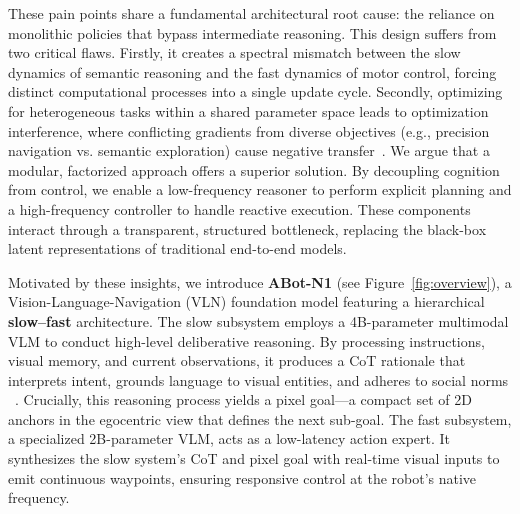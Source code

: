 

These pain points share a fundamental architectural root cause: the reliance on monolithic policies that bypass intermediate reasoning. 
This design suffers from two critical flaws. 
Firstly, it creates a spectral mismatch between the slow dynamics of semantic reasoning and the fast dynamics of motor control, forcing distinct computational processes into a single update cycle. 
Secondly, optimizing for heterogeneous tasks within a shared parameter space leads to optimization interference, where conflicting gradients from diverse objectives (e.g., precision navigation vs. semantic exploration) cause negative transfer~\cite{yu2020gradient,liu2021conflict}. 
We argue that a modular, factorized approach offers a superior solution. 
By decoupling cognition from control, we enable a low-frequency reasoner to perform explicit planning and a high-frequency controller to handle reactive execution. These components interact through a transparent, structured bottleneck, replacing the black-box latent representations of traditional end-to-end models.


Motivated by these insights, we introduce \textbf{ABot-N1} (see Figure~\ref{fig:overview}), a Vision-Language-Navigation (VLN) foundation model featuring a hierarchical \textbf{slow–fast} architecture. The slow subsystem employs a 4B-parameter multimodal VLM to conduct high-level deliberative reasoning. By processing instructions, visual memory, and current observations, it produces a CoT rationale that interprets intent, grounds language to visual entities, and adheres to social norms ~\cite{wei2022cot,deepseekai2025r1,chen2025socialnav}. Crucially, this reasoning process yields a pixel goal—a compact set of 2D anchors in the egocentric view that defines the next sub-goal. The fast subsystem, a specialized 2B-parameter VLM, acts as a low-latency action expert. It synthesizes the slow system’s CoT and pixel goal with real-time visual inputs to emit continuous waypoints, ensuring responsive control at the robot’s native frequency.

